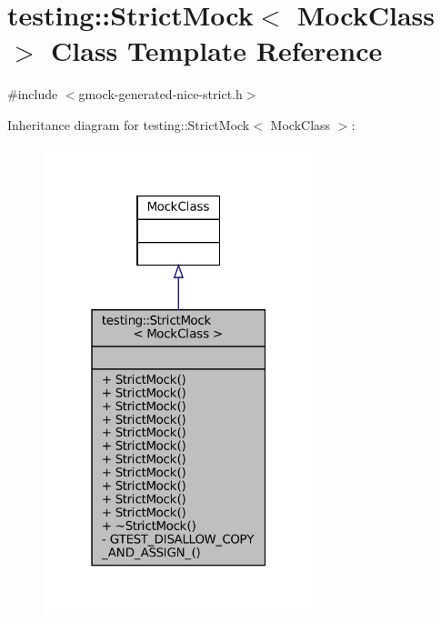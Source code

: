 \hypertarget{classtesting_1_1StrictMock}{}\section{testing\+:\+:Strict\+Mock$<$ Mock\+Class $>$ Class Template Reference}
\label{classtesting_1_1StrictMock}


{\ttfamily \#include $<$gmock-\/generated-\/nice-\/strict.\+h$>$}



Inheritance diagram for testing\+:\+:Strict\+Mock$<$ Mock\+Class $>$\+:
\nopagebreak
\begin{figure}[H]
\begin{center}
\leavevmode
\includegraphics[width=223pt]{classtesting_1_1StrictMock__inherit__graph}
\end{center}
\end{figure}


